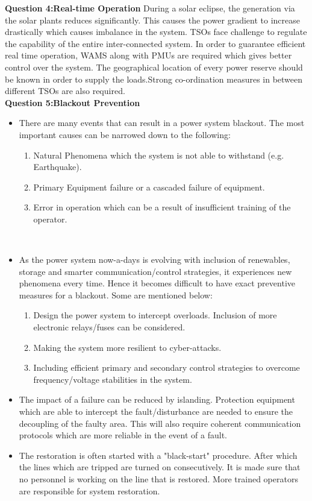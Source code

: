 {\textbf{Question 4:Real-time Operation}}\newline
During a solar eclipse, the generation via the solar plants reduces significantly. This causes the power gradient to increase drastically which causes imbalance in the system.
TSOs face challenge to regulate the capability of the entire inter-connected system. In order to  guarantee efficient real time operation, WAMS along with PMUs are required which gives better control over the system. The geographical location of every power reserve should be known in order to supply the loads.Strong co-ordination measures in between different TSOs are also required.\\

{\textbf{Question 5:Blackout Prevention}}
\begin{itemize}
    \item There are many events that can result in a power system blackout. The most important causes can be narrowed down to the following:
    \begin{enumerate}
        \item Natural Phenomena which the system is not able to withstand (e.g. Earthquake).
        \item Primary Equipment failure or a cascaded failure of equipment.
        \item Error in operation which can be a result of insufficient training of the operator. 
    \end{enumerate}\\
    \item As the power system now-a-days is evolving with inclusion of renewables, storage and smarter communication/control strategies, it experiences new phenomena every time. Hence it becomes difficult to have exact preventive measures for a blackout. Some are mentioned below:
    \begin{enumerate}
        \item Design the power system to intercept overloads. Inclusion of more electronic relays/fuses can be considered.
        \item Making the system more resilient to cyber-attacks.
        \item Including efficient primary and secondary control strategies to overcome frequency/voltage stabilities in the system.
    \end{enumerate}
    \item The impact of a failure can be reduced by islanding. Protection equipment which are able to intercept the fault/disturbance are needed to ensure the decoupling of the faulty area. This will also require coherent communication protocols which are more reliable in the event of a fault.
    \item The restoration is often started with a "black-start" procedure. After which the lines which are tripped are turned on consecutively. It is made sure that no personnel is working on the line that is restored. More trained operators are responsible for system restoration.
    \newpage
\end{itemize}
